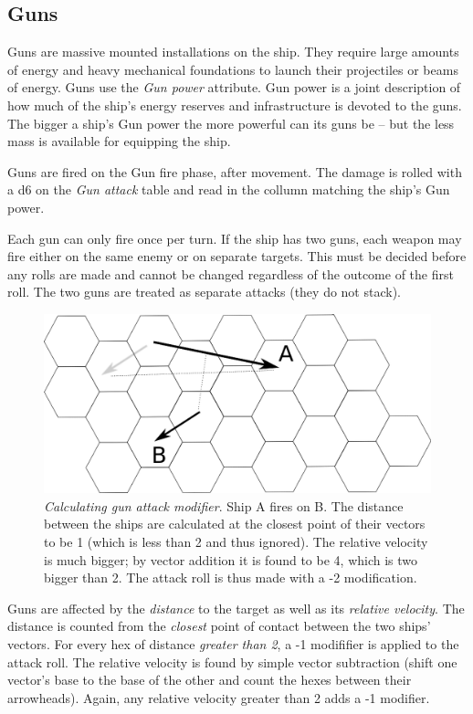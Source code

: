\documentclass[a4paper,12pt,notitlepage,twocolumn]{article}
\begin{document}
\subsection{Guns}

Guns are massive mounted installations on the ship. They require large
amounts of energy and heavy 
mechanical foundations to launch their projectiles or beams of
energy. Guns use the \emph{Gun power} attribute. Gun power is a joint
description of how much of the ship's energy reserves and
infrastructure is devoted to the guns. The bigger a ship's Gun power
the more powerful can its guns be -- but the less mass is available
for equipping the ship.

Guns are fired on the Gun fire phase, after movement. The damage is
rolled with a d6 on the \emph{Gun attack} table and read in the
collumn matching the ship's Gun power.  

Each gun can only fire once per turn. If the ship has two guns, each
weapon may fire either on the same enemy or on separate
targets. This must be decided before any rolls are made and cannot be
changed regardless of the outcome of the first roll. The two guns are treated as
separate attacks (they do not stack).  

\begin{figure}[h!]\centering 
  \includegraphics[width=0.5 \textwidth]{data/combat_2.eps}
  \caption{\footnotesize \emph{Calculating gun attack modifier}. Ship A fires
    on B. The distance
    between the ships are calculated at the closest point of their
    vectors to be 1 (which is less than 2 and thus ignored). The relative velocity is much bigger; by vector
    addition it is found to be 4, which is two bigger than 2. The
    attack roll is thus made with a -2 modification. } 
\label{fig:11}
\end{figure}

Guns are affected by the \emph{distance} to the target as well as its
\emph{relative velocity}. The distance is counted from 
the \emph{closest} point of contact between the two ships'
vectors. For every hex of distance \emph{greater than 2}, a -1 modififier
is applied to the attack roll. The relative velocity is found by
simple vector subtraction (shift one vector's base to the base of the
other and count the hexes between their arrowheads). Again, any
relative velocity greater than 2 adds a -1 modifier. 
\end{document}
